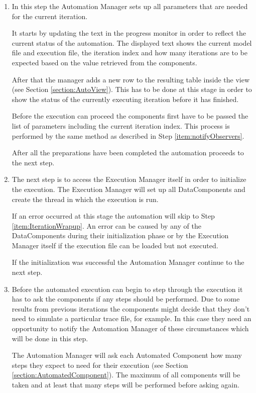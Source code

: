 \begin{enumerate}
 \item \label{item:setupIteration} In this step the Automation Manager sets up all 
parameters that are needed for the current iteration.

It starts by updating the text in the progress monitor in order to reflect the
current status of the automation. The displayed text shows the current model file
and execution file, the iteration index and how many iterations are to be expected
based on the value retrieved from the components.

After that the manager adds a new row to the resulting table inside the view (see Section
\ref{section:AutoView}). This has to be done at this stage in order to show the 
status of the currently executing iteration before it has finished.

Before the execution can proceed the components first have to be passed the list
of parameters including the current iteration index. This process is performed by
the same method as described in Step \ref{item:notifyObservers}.

After all the preparations have been completed the automation proceeds to the next
step.
 
 \item \label{item:initExecution} The next step is to access the Execution Manager
itself in order to initialize the execution. The Execution Manager will set up all
DataComponents and create the thread in which the execution is run.

If an error occurred at this stage the automation will skip to Step \ref{item:IterationWrapup}.
An error can be caused by any of the DataComponents during their initialization phase or
by the Execution Manager itself if the execution file can be loaded but not executed.

If the initialization was successful the Automation Manager continue to the next step.

 \item \label{item:askForSteps1} Before the automated execution can begin to step through
the execution it has to ask the components if any steps should be performed. Due to some results
from previous iterations the components might decide that they don't need to simulate a particular
trace file, for example. In this case they need an opportunity to notify the Automation Manager
of these circumstances which will be done in this step.

The Automation Manager will ask each Automated Component how many steps they expect to
need for their execution (see Section \ref{section:AutomatedComponent}). The maximum of
all components will be taken and at least that many steps will be performed before asking again.


\end{enumerate}
